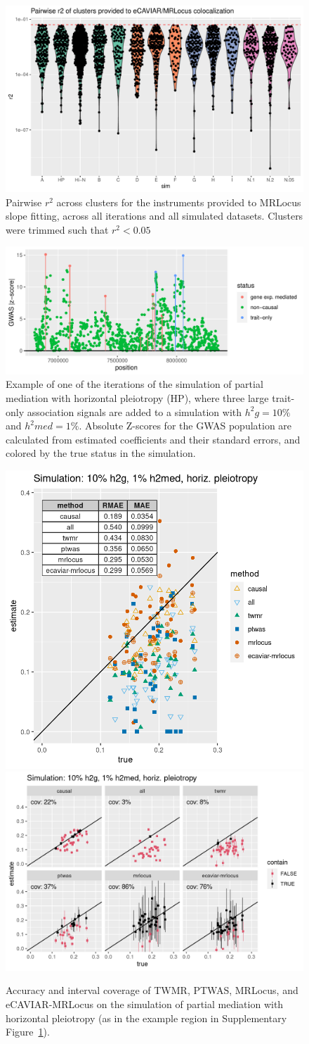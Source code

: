 \documentclass[11pt]{article}
\begin{document}
\begin{figure}[!ht]
  \centering
  \includegraphics[width=.5\textwidth]{figs/sim_cluster_r2}
  \caption{Pairwise $r^2$ across clusters for the instruments provided
    to MRLocus slope fitting, across all iterations and all simulated
    datasets. Clusters were trimmed such that $r^2 < 0.05$}
\end{figure}

\begin{figure}[!ht]
  \centering
  \includegraphics[width=.7\textwidth]{figs/hp_example}
  \caption{Example of one of the iterations of the simulation of
    partial mediation with horizontal pleiotropy (HP), where three
    large trait-only association signals are added to a simulation
    with $h^2g = 10\%$ and $h^2med = 1\%$. Absolute Z-scores for the
    GWAS population are calculated from estimated coefficients and
    their standard errors, and colored by the true status in the
    simulation.}
  \label{sf:hp}
\end{figure}

\begin{figure}[!ht]
  \centering
  \includegraphics[width=.33\textwidth]{figs/simhp.png}
  \includegraphics[width=.5\textwidth]{figs/coverhp.png}
  \caption{Accuracy and interval coverage of TWMR, PTWAS, MRLocus, and
  eCAVIAR-MRLocus on the simulation of partial mediation with
  horizontal pleiotropy (as in the example region in Supplementary
  Figure~\ref{sf:hp}).}
\end{figure}
\end{document}
